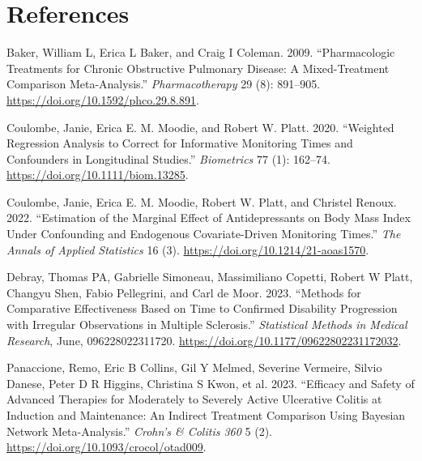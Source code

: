 \documentclass[
  letterpaper,
  DIV=11,
  numbers=noendperiod]{scrreprt}
\newlength{\cslhangindent}
\newlength{\cslentryspacingunit} %
\newenvironment{CSLReferences}[2] %
 {%
  \setlength{\parindent}{0pt}
  \ifodd #1
  \let\oldpar\par
  \def\par{\hangindent=\cslhangindent\oldpar}
  \fi
  \setlength{\parskip}{#2\cslentryspacingunit}
 }%
 {}
\begin{document}
\hypertarget{references-4}{%
\section*{References}\label{references-4}}


\hypertarget{refs}{}
\begin{CSLReferences}{1}{0}
\leavevmode{}%
Baker, William L, Erica L Baker, and Craig I Coleman. 2009.
{``Pharmacologic Treatments for Chronic Obstructive Pulmonary Disease: A
Mixed-Treatment Comparison Meta-Analysis.''} \emph{Pharmacotherapy} 29
(8): 891--905. \url{https://doi.org/10.1592/phco.29.8.891}.

\leavevmode{}%
Coulombe, Janie, Erica E. M. Moodie, and Robert W. Platt. 2020.
{``Weighted Regression Analysis to Correct for Informative Monitoring
Times and Confounders in Longitudinal Studies.''} \emph{Biometrics} 77
(1): 162--74. \url{https://doi.org/10.1111/biom.13285}.

\leavevmode{}%
Coulombe, Janie, Erica E. M. Moodie, Robert W. Platt, and Christel
Renoux. 2022. {``Estimation of the Marginal Effect of Antidepressants on
Body Mass Index Under Confounding and Endogenous Covariate-Driven
Monitoring Times.''} \emph{The Annals of Applied Statistics} 16 (3).
\url{https://doi.org/10.1214/21-aoas1570}.

\leavevmode{}%
Debray, Thomas PA, Gabrielle Simoneau, Massimiliano Copetti, Robert W
Platt, Changyu Shen, Fabio Pellegrini, and Carl de Moor. 2023.
{``Methods for Comparative Effectiveness Based on Time to Confirmed
Disability Progression with Irregular Observations in Multiple
Sclerosis.''} \emph{Statistical Methods in Medical Research}, June,
096228022311720. \url{https://doi.org/10.1177/09622802231172032}.

\leavevmode{}%
Panaccione, Remo, Eric B Collins, Gil Y Melmed, Severine Vermeire,
Silvio Danese, Peter D R Higgins, Christina S Kwon, et al. 2023.
{``Efficacy and Safety of Advanced Therapies for Moderately to Severely
Active Ulcerative Colitis at Induction and Maintenance: An Indirect
Treatment Comparison Using Bayesian Network Meta-Analysis.''}
\emph{Crohn's \& Colitis 360} 5 (2).
\url{https://doi.org/10.1093/crocol/otad009}.


\end{CSLReferences}
\end{document}
